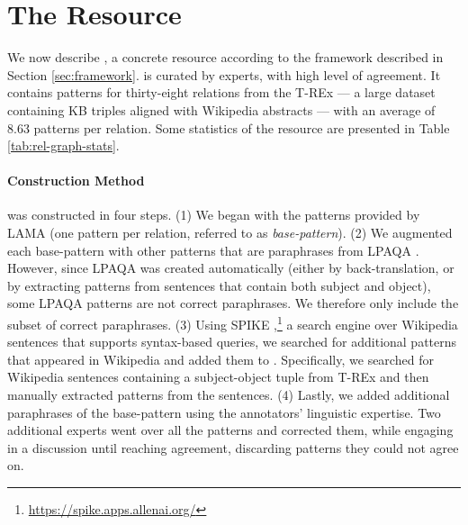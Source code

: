 \section{The \resource{} Resource}
\label{sec:rel-graph}

We now describe \resource{}, a concrete resource according to the framework described in Section \ref{sec:framework}.
\resource{} is curated by experts, with high level of agreement.
It contains patterns for thirty-eight relations from the T-REx \cite{trex} --- a large dataset containing KB triples aligned with Wikipedia abstracts --- with an average of 8.63 patterns per relation.
Some statistics of the resource are presented in Table \ref{tab:rel-graph-stats}.


\paragraph{Construction Method}
\resource{} was constructed in four steps. (1) We began with
the patterns provided by LAMA \cite{lama} (one pattern per
relation, referred to as \textit{base-pattern}). (2) We augmented each base-pattern with other patterns that are paraphrases from
LPAQA \cite{alpaqa}. However, since LPAQA was
created automatically (either by back-translation, or by extracting patterns from sentences that contain both subject and object), some LPAQA patterns are not
correct paraphrases.
We therefore only include the subset of correct paraphrases.
(3) Using SPIKE
\cite{spike},\footnote{\url{https://spike.apps.allenai.org/}}
a search engine over Wikipedia sentences that supports
syntax-based queries, we searched for additional patterns
that appeared in Wikipedia and added them to 
\resource{}. Specifically, we searched for Wikipedia sentences
containing a  subject-object
tuple from T-REx and then manually extracted 
patterns from the  sentences. (4) Lastly, we added
additional paraphrases of the base-pattern
using the annotators' linguistic expertise. Two additional
experts went over all the patterns and corrected them, while
engaging in a discussion until reaching  agreement,
discarding patterns they could not agree on.







